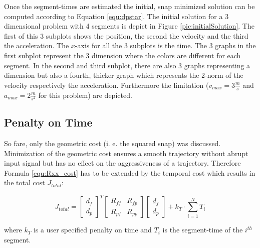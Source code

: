 Once the segment-times are estimated the initial, snap minimized solution can be computed according to Equation \ref{equ:dpstar}. The initial solution for a 3 dimensional problem with 4 segments is depict in Figure \ref{pic:initialSolution}. The first of this 3 subplots shows the position, the second the velocity and the third the acceleration. The $x$-axis for all the 3 subplots is the time. The 3 graphs in the first subplot represent the 3 dimension where the colors are different for each segment. In the second and third subplot, there are also 3 graphs representing a dimension but also a fourth, thicker graph which represents the 2-norm of the velocity respectively the acceleration. Furthermore the limitation ($v_{max} = 3 \frac{m}{s}$ and $a_{max} = 2 \frac{m}{s^2}$ for this problem) are depicted.

\subsection{Penalty on Time}\label{sec:penalty}

So fare, only the geometric cost (i. e. the squared snap) was discussed. Minimization of the geometric cost ensures a smooth trajectory without abrupt input signal but has no effect on the aggressiveness of a trajectory. Therefore Formula \ref{equ:Rxx_cost} has to be extended by the temporal cost which results in the total cost $J_{total}$:

\begin{equation}
J_{total} =
\begin{bmatrix}
   d_f \\
  d_p
\end{bmatrix}^T
\begin{bmatrix}
   R_{ff} & R_{fp} \\
  R_{pf} & R_{pp}
\end{bmatrix}
\begin{bmatrix}
   d_f \\
  d_p
\end{bmatrix}
+ k_T \cdot \sum_{i=1}^N T_i
\label{equ:total_cost}
\end{equation}

where $k_T$ is a user specified penalty on time and $T_i$ is the segment-time of the $i^{th}$ segment.

